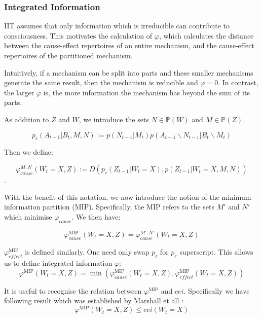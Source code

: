 \subsubsection{Integrated Information}
\label{sec:mech_integration}
IIT assumes that only information which is irreducible can contribute to consciousness. This motivates the calculation of $\varphi$, which calculates the distance between the cause-effect repertoires of an entire mechanism, and the cause-effect repertoires of the partitioned mechanism. 

Intuitively, if a mechanism can be split into parts and these smaller mechanisms generate the same result, then the mechanism is reducible and $\varphi=0$. In contrast, the larger $\varphi$ is, the more information the mechanism has beyond the sum of its parts.

As addition to $Z$ and $W$, we introduce the sets $N \in \mathbb{P}(W)$ and $M \in \mathbb{P}(Z)$.

\begin{equation}
\label{def:preMIP}
p_c(A_{t-1}|B_t ,M, N):= p(N_{t-1}|M_t) p(A_{t-1} \backslash N_{t-1} |B_t \backslash M_t)
\end{equation}

Then we define:

\begin{equation}
\label{def:phi2}
\varphi_{cause}^{M,N}(W_t=X, Z) := D \left( p_c(Z_{t-1}|W_t=X) ,p(Z_{t-1}|W_{t} = X,M,N)  \right)
\end{equation}.

With the benefit of this notation, we now introduce the notion of the minimum information partition (MIP). Specifically, the MIP refers to the sets $M'$ and $N'$ which minimise $\varphi_{cause}$. We then have:

\begin{equation}
\label{def:phi3}
\varphi_{cause}^{\text{MIP}}(W_t=X, Z)  = \varphi_{cause}^{M',N'}(W_t=X, Z) 
\end{equation}

$\varphi^{\text{MIP}}_{effect}$ is defined similarly. One need only swap $p_c$ for $p_e$ superscript. This allows us to define integrated information $\varphi$:
\begin{equation}
\label{def:phi}
\varphi^{\text{MIP}}(W_t=X, Z) = \min \left( \varphi_{cause}^{\text{MIP}}(W_t=X, Z), \varphi_{effect}^{\text{MIP}}(W_t=X, Z)  \right) 
\end{equation}



It is useful to recognise the relation between $\varphi^{\text{MIP}}$ and $cei$. Specifically we have following result which was established by Marshall et all \cite{marshall2016integrated}:
\begin{equation}
\label{eq:bound_phi_cei}
\varphi^{\text{MIP}}(W_t=X, Z) \leq cei(W_t=X) 
\end{equation}

